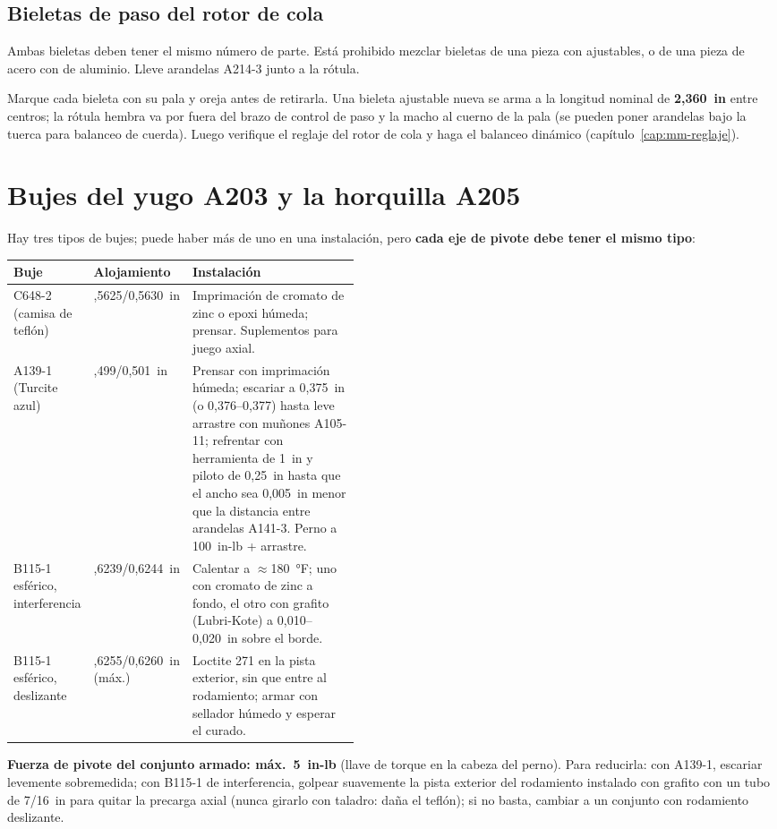 \subsection{Bieletas de paso del rotor de cola}

\begin{advertencia}
Ambas bieletas deben tener el mismo número de parte. Está prohibido mezclar bieletas de una pieza con ajustables, o de una pieza de acero con de aluminio. Lleve arandelas A214-3 junto a la rótula.
\end{advertencia}

Marque cada bieleta con su pala y oreja antes de retirarla. Una bieleta ajustable nueva se arma a la longitud nominal de \textbf{2,360~in} entre centros; la rótula hembra va por fuera del brazo de control de paso y la macho al cuerno de la pala (se pueden poner arandelas bajo la tuerca para balanceo de cuerda). Luego verifique el reglaje del rotor de cola y haga el balanceo dinámico (capítulo~\ref{cap:mm-reglaje}).

\section{Bujes del yugo A203 y la horquilla A205}

Hay tres tipos de bujes; puede haber más de uno en una instalación, pero \textbf{cada eje de pivote debe tener el mismo tipo}:

\begin{center}
\small\begin{tabularx}{\linewidth}{@{}>{\raggedright\arraybackslash}p{0.2\linewidth}>{\raggedright\arraybackslash}p{0.25\linewidth}>{\raggedright\arraybackslash}X@{}}
\toprule
Buje & Alojamiento & Instalación \\
\midrule
C648-2 (camisa de teflón) & 0,5625/0,5630~in & Imprimación de cromato de zinc o epoxi húmeda; prensar. Suplementos para juego axial. \\
A139-1 (Turcite azul) & 0,499/0,501~in & Prensar con imprimación húmeda; escariar a 0,375~in (o 0,376--0,377) hasta leve arrastre con muñones A105-11; refrentar con herramienta de 1~in y piloto de 0,25~in hasta que el ancho sea 0,005~in menor que la distancia entre arandelas A141-3. Perno a 100~in-lb + arrastre. \\
B115-1 esférico, interferencia & 0,6239/0,6244~in & Calentar a $\approx$180~°F; uno con cromato de zinc a fondo, el otro con grafito (Lubri-Kote) a 0,010--0,020~in sobre el borde. \\
B115-1 esférico, deslizante & 0,6255/0,6260~in (máx.) & Loctite 271 en la pista exterior, sin que entre al rodamiento; armar con sellador húmedo y esperar el curado. \\
\bottomrule
\end{tabularx}
\end{center}

\textbf{Fuerza de pivote del conjunto armado: máx.\ 5~in-lb} (llave de torque en la cabeza del perno). Para reducirla: con A139-1, escariar levemente sobremedida; con B115-1 de interferencia, golpear suavemente la pista exterior del rodamiento instalado con grafito con un tubo de 7/16~in para quitar la precarga axial (nunca girarlo con taladro: daña el teflón); si no basta, cambiar a un conjunto con rodamiento deslizante.
